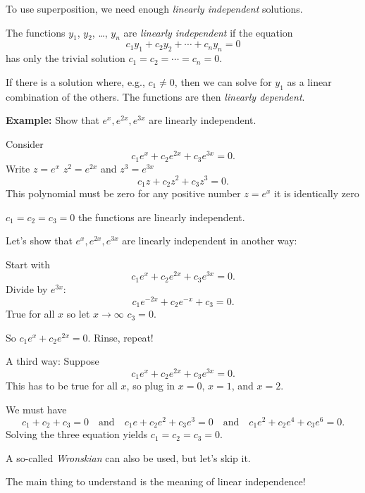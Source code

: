 \documentclass[10pt,aspectratio=169]{beamer}
\begin{document}
\begin{frame}

To use superposition, we need enough \emph{linearly independent} solutions.

\medskip
\pause

The functions $y_1$, $y_2$, \ldots, $y_n$ are \emph{linearly independent} if
the equation
\[
c_1 y_1 + c_2 y_2 + \cdots + c_n y_n = 0 
\]
has only the trivial solution $c_1 = c_2 = \cdots = c_n = 0$.

\medskip
\pause

If there is a solution where, e.g.,
$c_1 \not= 0$, then we
can solve for $y_1$ as a linear combination of the others.
\pause
The functions are then
\emph{linearly dependent}.

\medskip
\pause

\textbf{Example:} Show that $e^x, e^{2x}, e^{3x}$ are linearly independent.

\medskip
\pause

Consider
\[
c_1 e^x + c_2 e^{2x} + c_3 e^{3x} = 0.
\]
\pause
Write $z = e^x$
\pause
\wthus
$z^2 = e^{2x}$ and $z^3 = e^{3x}$ \pause \wthus
\[
c_1 z + c_2 z^2 + c_3 z^3 = 0.
\]
\pause
This polynomial must be zero for any positive number $z=e^{x}$
\pause
\wthus
it is identically zero

\pause
\thus
\quad
$c_1 = c_2 = c_3 = 0$
\pause
\wthus
the functions are linearly independent.
\end{frame}

\begin{frame}

Let's show that $e^x, e^{2x}, e^{3x}$ are linearly independent in another
way:

\medskip
\pause

Start with
\[
c_1 e^x + c_2 e^{2x} + c_3 e^{3x} = 0.
\]
\pause
Divide by $e^{3x}$:
\[
c_1 e^{-2x} + c_2 e^{-x} + c_3 = 0.
\]
\pause
True for all $x$ so let $x \to \infty$
\pause
\wthus $c_3 = 0$.

\medskip
\pause

So $c_1 e^x + c_2 e^{2x} = 0$.
\pause Rinse, repeat!

\medskip
\pause

A third way:  Suppose
\[
c_1 e^x + c_2 e^{2x} + c_3 e^{3x} = 0.
\]
This has to be true for all $x$, so plug in $x=0$, $x=1$, and $x=2$.

\medskip
\pause

We must have
\[
c_1 + c_2 + c_3 = 0
\quad\text{and}\quad
c_1 e + c_2 e^{2} + c_3 e^{3} = 0
\quad\text{and}\quad
c_1 e^2 + c_2 e^{4} + c_3 e^{6} = 0.
\]
\pause
Solving the three equation yields $c_1=c_2=c_3=0$.

\medskip
\pause

A so-called \emph{Wronskian} can also be used, but let's skip it.
\pause

The main thing to understand is the meaning of linear independence!

\end{frame}
\end{document}
